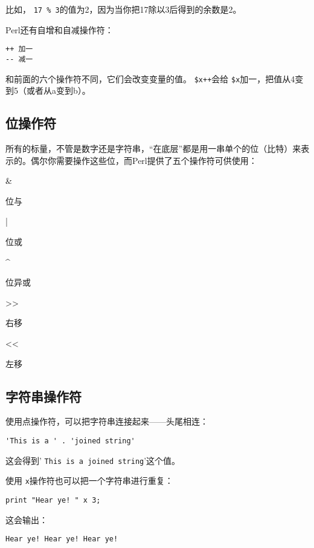 比如， \verb|17 % 3|的值为2，因为当你把17除以3后得到的余数是2。

Perl还有自增和自减操作符：

\begin{lstlisting}
++ 加一
-- 减一
\end{lstlisting}

和前面的六个操作符不同，它们会改变变量的值。 \verb|$x++|会给 \verb|$x|加一，把值从4变到5（或者从a变到b）。

\subsection{位操作符}
所有的标量，不管是数字还是字符串，“在底层”都是用一串单个的位（比特）来表示的。偶尔你需要操作这些位，而Perl提供了五个操作符可供使用：

\noindent
\textcolor{black}{\&}
\begin{adjustwidth}{4em}{}
位与
\end{adjustwidth}
\textcolor{black}{|}
\begin{adjustwidth}{4em}{}
位或
\end{adjustwidth}
\textcolor{black}{\^{}}
\begin{adjustwidth}{4em}{}
位异或
\end{adjustwidth}
\textcolor{black}{\textgreater\textgreater}
\begin{adjustwidth}{4em}{}
右移
\end{adjustwidth}
\textcolor{black}{\textless\textless}
\begin{adjustwidth}{4em}{}
左移
\end{adjustwidth}

\subsection{字符串操作符}
使用点操作符，可以把字符串连接起来——头尾相连：

\begin{lstlisting}
'This is a ' . 'joined string'
\end{lstlisting}

这会得到' \verb|This is a joined string|'这个值。

使用 \verb|x|操作符也可以把一个字符串进行重复：

\begin{lstlisting}
print "Hear ye! " x 3;
\end{lstlisting}

这会输出：

\begin{lstlisting}
Hear ye! Hear ye! Hear ye!
\end{lstlisting}

